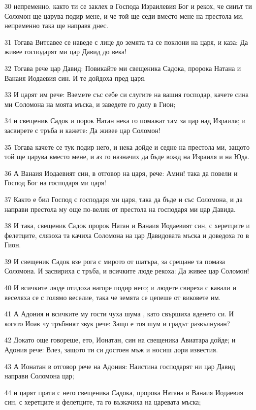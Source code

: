 \par 30 непременно, както ти се заклех в Господа Израилевия Бог и рекох, че синът ти Соломон ще царува подир мене, и че той ще седи вместо мене на престола ми, непременно така ще направя днес.
\par 31 Тогава Витсавее се наведе с лице до земята та се поклони на царя, и каза: Да живее господарят ми цар Давид до века!
\par 32 Тогава рече цар Давид: Повикайте ми свещеника Садока, пророка Натана и Ванаия Иодаевия син. И те дойдоха пред царя.
\par 33 И царят им рече: Вземете със себе си слугите на вашия господар, качете сина ми Соломона на моята мъска, и заведете го долу в Гион;
\par 34 и свещеник Садок и порок Натан нека го помажат там за цар над Израиля; и засвирете с тръба и кажете: Да живее цар Соломон!
\par 35 Тогава качете се тук подир него, и нека дойде и седне на престола ми, защото той ще царува вместо мене, и аз го назначих да бъде вожд на Израиля и на Юда.
\par 36 А Ванаия Иодаевият син, в отговор на царя, рече: Амин! така да повели и Господ Бог на господаря ми царя!
\par 37 Както е бил Господ с господаря ми царя, така да бъде и със Соломона, и да направи престола му още по-велик от престола на господаря ми цар Давида.
\par 38 И така, свещеник Садок пророк Натан и Ванаия Иодаевият син, с херетците и фелетците, слязоха та качиха Соломона на цар Давидовата мъска и доведоха го в Гион.
\par 39 И свещеник Садок взе рога с мирото от шатъра, за срещане та помаза Соломона. И засвириха с тръба, и всичките люде рекоха: Да живее цар Соломон!
\par 40 И всичките люде отидоха нагоре подир него; и людете свиреха с кавали и веселяха се с голямо веселие, така че земята се цепеше от виковете им.
\par 41 А Адония и всичките му гости чуха шума , като свършиха яденето си. И когато Иоав чу тръбният звук рече: Защо е тоя шум и градът развълнуван?
\par 42 Докато още говореше, ето, Ионатан, син на свещеника Авиатара дойде; и Адония рече: Влез, защото ти си достоен мъж и носиш дори известия.
\par 43 А Ионатан в отговор рече на Адония: Наистина господарят ни цар Давид направи Соломона цар;
\par 44 и царят прати с него свещеника Садока, пророка Натана и Ванаия Иодаевия син, с херетците и фелетците, та го възкачиха на царевата мъска;
